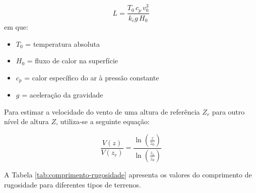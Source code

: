         \begin{equation}
            L = \frac{T_0 \, c_p \, v_0^3}{k_c g \, H_0}
        \end{equation}
        em que:
        \begin{itemize}
                \item $T_0$ = temperatura absoluta
                \item $H_0$ = fluxo de calor na superfície
                \item $c_p$ = calor específico do ar à pressão constante
                \item $g$ = aceleração da gravidade
        \end{itemize}
        
        \par Para estimar a velocidade do vento de uma altura de referência $Z_r$ para outro nível de altura $Z$, utiliza-se a seguinte equação:

        \begin{equation}
            \frac{V(z)}{V(z_r)} = \frac{\ln \left( \frac{z}{z_0} \right)}{\ln \left( \frac{z_r}{z_0} \right)}
        \end{equation}

        \par A Tabela \ref{tab:comprimento-rugosidade} apresenta os valores do comprimento de rugosidade para diferentes tipos de terrenos.

